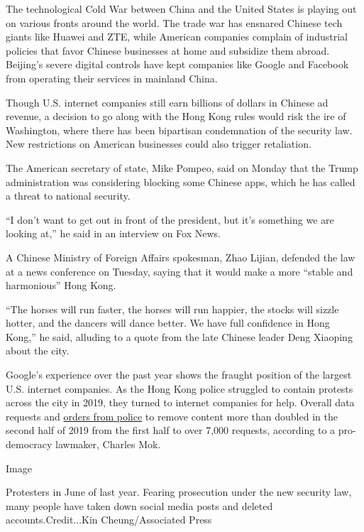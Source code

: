 The technological Cold War between China and the United States is
playing out on various fronts around the world. The trade war has
ensnared Chinese tech giants like Huawei and ZTE, while American
companies complain of industrial policies that favor Chinese businesses
at home and subsidize them abroad. Beijing's severe digital controls
have kept companies like Google and Facebook from operating their
services in mainland China.

Though U.S. internet companies still earn billions of dollars in Chinese
ad revenue, a decision to go along with the Hong Kong rules would risk
the ire of Washington, where there has been bipartisan condemnation of
the security law. New restrictions on American businesses could also
trigger retaliation.

The American secretary of state, Mike Pompeo, said on Monday that the
Trump administration was considering blocking some Chinese apps, which
he has called a threat to national security.

``I don't want to get out in front of the president, but it's something
we are looking at,'' he said in an interview on Fox News.

A Chinese Ministry of Foreign Affairs spokesman, Zhao Lijian, defended
the law at a news conference on Tuesday, saying that it would make a
more ``stable and harmonious'' Hong Kong.

``The horses will run faster, the horses will run happier, the stocks
will sizzle hotter, and the dancers will dance better. We have full
confidence in Hong Kong,'' he said, alluding to a quote from the late
Chinese leader Deng Xiaoping about the city.

Google's experience over the past year shows the fraught position of the
largest U.S. internet companies. As the Hong Kong police struggled to
contain protests across the city in 2019, they turned to internet
companies for help. Overall data requests and
\href{https://www.charlesmok.hk/legco/council-question-requests-made-to-information-and-communication-technology-companies-for-disclosure-and-removal-of-information/}{orders
from police} to remove content more than doubled in the second half of
2019 from the first half to over 7,000 requests, according to a
pro-democracy lawmaker, Charles Mok.

Image

Protesters in June of last year. Fearing prosecution under the new
security law, many people have taken down social media posts and deleted
accounts.Credit...Kin Cheung/Associated Press


